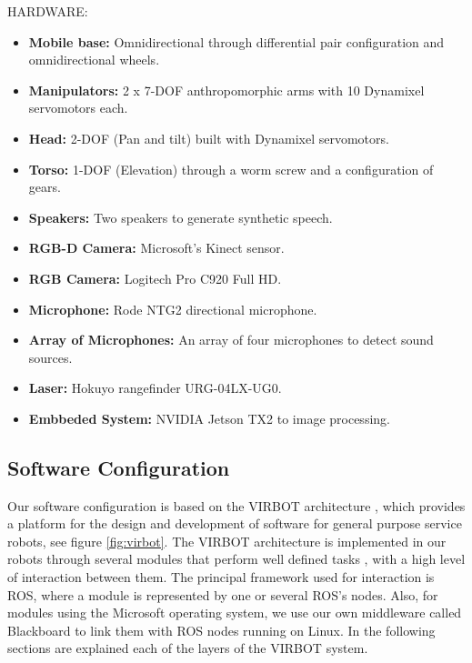 \documentclass{llncs}
\begin{document}
HARDWARE:

\begin{itemize}
	\item \textbf{Mobile base:} Omnidirectional through differential pair configuration and omnidirectional wheels. 
	\item \textbf{Manipulators:} 2 x 7-DOF anthropomorphic arms with 10 Dynamixel servomotors each.
	\item \textbf{Head:} 2-DOF (Pan and tilt) built with Dynamixel servomotors.
	\item \textbf{Torso:} 1-DOF (Elevation) through a worm screw and a configuration of gears. 
	\item \textbf{Speakers:} Two speakers to generate synthetic speech.
	\item \textbf{RGB-D Camera:} Microsoft's Kinect sensor. 
	\item \textbf{RGB Camera:} Logitech Pro C920 Full HD.
	\item \textbf{Microphone:} Rode NTG2 directional microphone.
	\item \textbf{Array of Microphones:} An array of four microphones to detect sound sources.
	\item \textbf{Laser:} Hokuyo rangefinder URG-04LX-UG0.
	\item \textbf{Embbeded System:} NVIDIA Jetson TX2 to image processing.
\end{itemize}



\subsection{Software Configuration}
Our software configuration is based on the VIRBOT architecture \cite{virbot}, 
which provides a platform for the design and development of software for general purpose service robots, see figure \ref{fig:virbot}. 
The VIRBOT architecture is implemented in our robots through several modules that perform well defined tasks \cite{muller}, with a 
high level of interaction between them. The principal framework used for interaction is ROS, where a module is represented by one or 
several ROS's nodes. Also, for modules using the Microsoft operating system, we use our own middleware called Blackboard to
link them with ROS nodes running on Linux.
In the following sections are explained each of the layers of the VIRBOT system.
\end{document}
